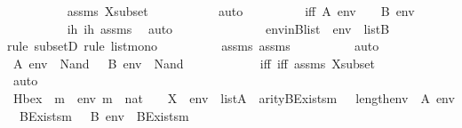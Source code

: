 \begin{isabellebody}
\ \ \ \ \ \ \ \ \isamarkupfalse%
\ assms{}\ Xsubset\ \isanewline
\ \ \ \ \ \ \ \ \isamarkupfalse%
\ auto\isanewline
\ \ \ \ \ \ \isamarkupfalse%
\ \isamarkupfalse%
\ iff{}{\isacharcolon}{\kern0pt}\ {\isachardoublequoteopen}A{\isacharcomma}{\kern0pt}\ env\ {\isasymTurnstile}\ {\isasympsi}\ {\isasymlongleftrightarrow}\ B{\isacharcomma}{\kern0pt}\ env\ {\isasymTurnstile}\ {\isasympsi}{\isachardoublequoteclose}\ \isanewline
\ \ \ \ \ \ \ \ \isamarkupfalse%
\ ih{}\ ih{}\ assms{}\ \isamarkupfalse%
\ auto\isanewline
\ \ \ \ \ \ \isanewline
\ \ \ \ \ \ \isamarkupfalse%
\ envinBlist\ {\isacharcolon}{\kern0pt}\ {\isachardoublequoteopen}env\ {\isasymin}\ list{\isacharparenleft}{\kern0pt}B{\isacharparenright}{\kern0pt}{\isachardoublequoteclose}\isanewline
\ \ \ \ \ \ \ \ \isamarkupfalse%
{\isacharparenleft}{\kern0pt}rule\ subsetD{\isacharcomma}{\kern0pt}\ rule\ list{\isacharunderscore}{\kern0pt}mono{\isacharparenright}{\kern0pt}\isanewline
\ \ \ \ \ \ \ \ \isamarkupfalse%
\ assms{}\ assms\isanewline
\ \ \ \ \ \ \ \ \isamarkupfalse%
\ auto\isanewline
\isanewline
\ \ \ \ \ \ \isamarkupfalse%
\ \isamarkupfalse%
\ {\isachardoublequoteopen}A{\isacharcomma}{\kern0pt}\ env\ {\isasymTurnstile}\ Nand{\isacharparenleft}{\kern0pt}{\isasymphi}{\isacharcomma}{\kern0pt}\ {\isasympsi}{\isacharparenright}{\kern0pt}\ {\isasymlongleftrightarrow}\ B{\isacharcomma}{\kern0pt}\ env\ {\isasymTurnstile}\ Nand{\isacharparenleft}{\kern0pt}{\isasymphi}{\isacharcomma}{\kern0pt}\ {\isasympsi}{\isacharparenright}{\kern0pt}{\isachardoublequoteclose}\ \isanewline
\ \ \ \ \ \ \ \ \isamarkupfalse%
\ iff{}\ iff{}\ assms{}\ Xsubset\ \isanewline
\ \ \ \ \ \ \ \ \isamarkupfalse%
\ auto\isanewline
\ \ \ \ \isamarkupfalse%
\isanewline
\isanewline
\ \ \ \ \isamarkupfalse%
\ Hbex\ {\isacharcolon}{\kern0pt}\ {\isachardoublequoteopen}{\isasymAnd}m\ {\isasymphi}\ env{\isachardot}{\kern0pt}\ m\ {\isasymin}\ nat\ {\isasymLongrightarrow}\ {\isasymphi}\ {\isasymin}\ X\ {\isasymLongrightarrow}\ env\ {\isasymin}\ list{\isacharparenleft}{\kern0pt}A{\isacharparenright}{\kern0pt}\ {\isasymLongrightarrow}\ arity{\isacharparenleft}{\kern0pt}BExists{\isacharprime}{\kern0pt}{\isacharparenleft}{\kern0pt}m{\isacharcomma}{\kern0pt}\ {\isasymphi}{\isacharparenright}{\kern0pt}{\isacharparenright}{\kern0pt}\ {\isasymle}\ length{\isacharparenleft}{\kern0pt}env{\isacharparenright}{\kern0pt}\ {\isasymLongrightarrow}\ A{\isacharcomma}{\kern0pt}\ env\ {\isasymTurnstile}\ BExists{\isacharprime}{\kern0pt}{\isacharparenleft}{\kern0pt}m{\isacharcomma}{\kern0pt}\ {\isasymphi}{\isacharparenright}{\kern0pt}\ {\isasymlongleftrightarrow}\ B{\isacharcomma}{\kern0pt}\ env\ {\isasymTurnstile}\ BExists{\isacharprime}{\kern0pt}{\isacharparenleft}{\kern0pt}m{\isacharcomma}{\kern0pt}\ {\isasymphi}{\isacharparenright}{\kern0pt}{\isachardoublequoteclose}\isanewline

\end{isabellebody}
